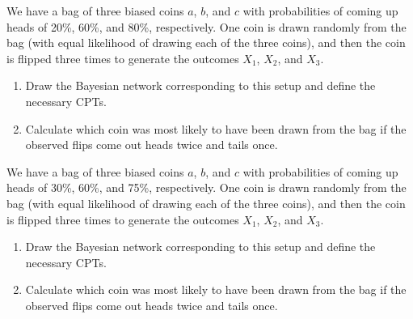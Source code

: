 
\begin{uexercise}
We have a bag of three biased coins \(a\), \(b\), and \(c\) with probabilities of coming 
up heads of 20\%, 60\%, and 80\%, respectively.  One coin is drawn randomly from the bag (with equal 
likelihood of drawing each of the three coins), and then the coin is flipped three times to 
generate the outcomes \(X_1\), \(X_2\), and \(X_3\). 
\begin{enumerate}
\item Draw the Bayesian network corresponding to this setup and define the necessary 
CPTs.
\item Calculate which coin was most likely to have been drawn from the bag if the observed flips
come out heads twice and tails once.
\end{enumerate}
\end{uexercise} 

\begin{iexercise}
We have a bag of three biased coins \(a\), \(b\), and \(c\) with probabilities of coming 
up heads of 30\%, 60\%, and 75\%, respectively.  One coin is drawn randomly from the bag (with equal 
likelihood of drawing each of the three coins), and then the coin is flipped three times to 
generate the outcomes \(X_1\), \(X_2\), and \(X_3\). 
\begin{enumerate}
\item Draw the Bayesian network corresponding to this setup and define the necessary 
CPTs.
\item Calculate which coin was most likely to have been drawn from the bag if the observed flips
come out heads twice and tails once.
\end{enumerate}
\end{iexercise} 

